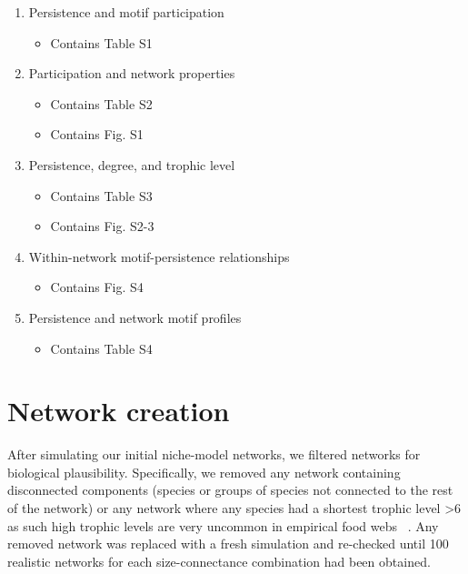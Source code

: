 \documentclass[12pt]{article}
\begin{document}
\begin{spacing}{2.0}
\begin{spacing}{1.0}
\begin{enumerate}
        
        \item Persistence and motif participation
            \begin{itemize}
                \item Contains Table S1
            \end{itemize}


        \item Participation and network properties

            \begin{itemize}
                \item Contains Table S2
                \item Contains Fig. S1
            \end{itemize}
    
        \item Persistence, degree, and trophic level

            \begin{itemize}
                \item Contains Table S3
                \item Contains Fig. S2-3
            \end{itemize}    

        \item Within-network motif-persistence relationships

            \begin{itemize}
                \item Contains Fig. S4
            \end{itemize}    
    
        \item Persistence and network motif profiles

            \begin{itemize}
                \item Contains Table S4
            \end{itemize}    
    \end{enumerate}    
\end{spacing}
\clearpage

\section{Network creation}

    After simulating our initial niche-model networks, we filtered networks for biological plausibility.
    Specifically, we removed any network containing disconnected components
    (species or groups of species not connected to the rest of the network) 
    or any network where any species had a shortest trophic level \textgreater6 as such high trophic levels are very uncommon in empirical food webs ~\citep{Riede2011}.
    Any removed network was replaced with a fresh simulation and re-checked until 100 realistic networks for each size-connectance combination had been obtained.
    


\end{spacing}
\end{document}
